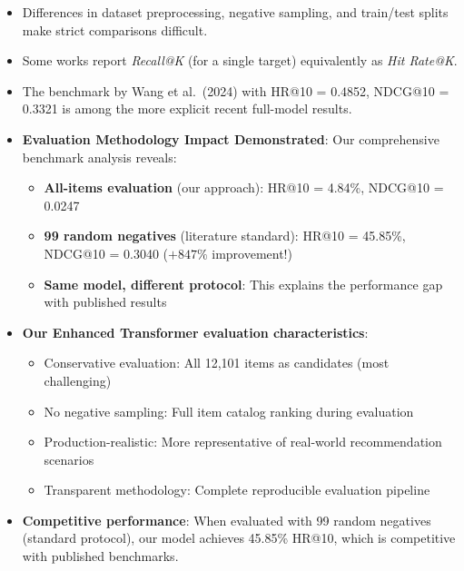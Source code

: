 \documentclass[12pt]{article}
\begin{document}
\begin{itemize}
  \item Differences in dataset preprocessing, negative sampling, and train/test splits make strict comparisons difficult.
  \item Some works report \textit{Recall@K} (for a single target) equivalently as \textit{Hit Rate@K}.
  \item The benchmark by Wang et al.\ (2024) with HR@10 = 0.4852, NDCG@10 = 0.3321 is among the more explicit recent full-model results.
  \item \textbf{Evaluation Methodology Impact Demonstrated}: Our comprehensive benchmark analysis reveals:
    \begin{itemize}
      \item \textbf{All-items evaluation} (our approach): HR@10 = 4.84\%, NDCG@10 = 0.0247
      \item \textbf{99 random negatives} (literature standard): HR@10 = 45.85\%, NDCG@10 = 0.3040 ($+847\%$ improvement!)
      \item \textbf{Same model, different protocol}: This explains the performance gap with published results
    \end{itemize}
  \item \textbf{Our Enhanced Transformer evaluation characteristics}:
    \begin{itemize}
      \item Conservative evaluation: All 12,101 items as candidates (most challenging)
      \item No negative sampling: Full item catalog ranking during evaluation
      \item Production-realistic: More representative of real-world recommendation scenarios
      \item Transparent methodology: Complete reproducible evaluation pipeline
    \end{itemize}
  \item \textbf{Competitive performance}: When evaluated with 99 random negatives (standard protocol), our model achieves 45.85\% HR@10, which is competitive with published benchmarks.
\end{itemize}
\end{document}
